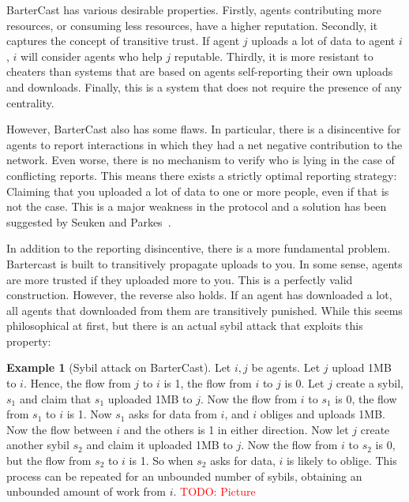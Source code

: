 \documentclass[a4paper,11pt]{book}
\newcommand\musthave[1]{\textcolor{red}{TODO: #1}}
\theoremstyle{definition}
\newtheorem*{example}{Example}
\begin{document}
BarterCast has various desirable properties. Firstly, agents contributing more resources, or consuming
less resources, have a higher reputation. Secondly, it captures the concept of transitive trust. If agent
$j$ uploads a lot of data to agent $i$, $i$ will consider agents who help $j$ reputable. Thirdly,
it is more resistant to cheaters than systems that are based on agents self-reporting their own uploads and
downloads. Finally, this is a system that does not require the presence of any centrality. 

However, BarterCast also has some flaws. In particular, there is a disincentive for agents to report
interactions in which they had a net negative contribution to the network. Even worse, there is no mechanism
to verify who is lying in the case of conflicting reports. This means there exists a strictly optimal 
reporting strategy: Claiming that you uploaded a lot of data to one or more people, even if that is not
the case. This is a major weakness in the protocol and a solution has been suggested by Seuken and 
Parkes~\cite{seuken2010accounting}. 

In addition to the reporting disincentive, there is a more fundamental problem. Bartercast is built
to transitively propagate uploads to you. In some sense, agents are more trusted if they uploaded
more to you. This is a perfectly valid construction. However, the reverse also holds. If an agent
has downloaded a lot, all agents that downloaded from them are transitively punished. While
this seems philosophical at first, but there is an actual sybil
attack that exploits this property:

\begin{example}[Sybil attack on BarterCast]
     Let $i, j$ be agents. Let $j$ upload 1MB to $i$. Hence, the flow from $j$ to $i$ is 1, the flow
    from $i$ to $j$ is 0. Let $j$ create a sybil, $s_1$ and claim that $s_1$ uploaded 1MB to $j$.
    Now the flow from $i$ to $s_1$ is $0$, the flow from $s_1$ to $i$ is 1. Now $s_1$ asks
    for data from $i$, and $i$ obliges and uploads 1MB. Now the flow between $i$ and the others is
    1 in either direction. Now let $j$ create another sybil $s_2$ and claim it uploaded 1MB to $j$. 
    Now the flow from $i$ to $s_2$ is 0, but the flow from $s_2$ to $i$ is 1. 
    So when $s_2$ asks for data, $i$ is likely to oblige. This process can be repeated for an unbounded
    number of sybils, obtaining an unbounded amount of work from $i$. \musthave{Picture}
\end{example}
\end{document}
